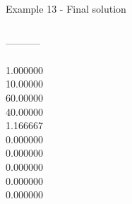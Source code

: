 \begin{frame}{Example 13 - Final solution}
\begin{columns}[t]
\begin{column}{0.3\textwidth}
-----------\\
\\
1.000000\\
10.00000\\
60.00000\\
40.00000\\
1.166667\\
0.000000\\
0.000000\\
0.000000\\
0.000000\\
0.000000\\
\end{column}
\end{columns}  
\end{frame}
